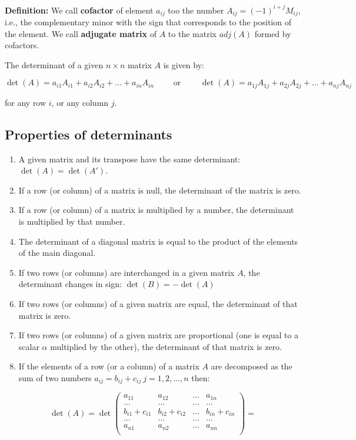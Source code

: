 \documentclass[11pt]{article}
\begin{document}
\textbf{Definition:} We call \textbf{cofactor} of element \(a_{ij}\) too
the number \(A_{ij} = (-1)^{i+j} M_{ij}\), i.e., the complementary minor
with the sign that corresponds to the position of the element. We call
\textbf{adjugate matrix} of \(A\) to the matrix \(adj(A)\) formed by
cofactors.

The determinant of a given \(n\times n\) matrix \(A\) is given by:

\[
\det(A) = a_{i1}A_{i1} + a_{i2}A_{i2} + \ldots + a_{in}A_{in} \qquad \text{ or } \qquad \det(A) = a_{1j}A_{1j} + a_{2j} A_{2j} + \ldots + a_{nj}A_{nj}
\]

for any row \(i\), or any column \(j\).

    \hypertarget{properties-of-determinants}{%
\subsection{Properties of
determinants}\label{properties-of-determinants}}

\begin{enumerate}
\def\labelenumi{\arabic{enumi}.}
\item
  A given matrix and its transpose have the same determinant:
  \(\det(A) = \det(A')\).
\item
  If a row (or column) of a matrix is null, the determinant of the
  matrix is zero.
\item
  If a row (or column) of a matrix is multiplied by a number, the
  determinant is multiplied by that number.
\item
  The determinant of a diagonal matrix is equal to the product of the
  elements of the main diagonal.
\item
  If two rows (or columns) are interchanged in a given matrix \(A\), the
  determinant changes in sign: \(\det(B) = -\det(A)\)
\item
  If two rows (or columns) of a given matrix are equal, the determinant
  of that matrix is zero.
\item
  If two rows (or columns) of a given matrix are proportional (one is
  equal to a scalar \(\alpha\) multiplied by the other), the determinant
  of that matrix is zero.
\item
  If the elements of a row (or a column) of a matrix \(A\) are
  decomposed as the sum of two numbers
  \(a_{ij} = b_{ij} + c_{ij} \: j = 1, 2, \ldots, n\) then:
\end{enumerate}

\[
  \det(A)  = \det \begin{pmatrix} a_{11} & a_{12} & \ldots & a_{1n} \\ \ldots & \ldots & \ldots & \ldots \\ b_{i1}+c_{i1} & b_{i2}+c_{i2} & \ldots & b_{in}+c_{in} \\  \ldots & \ldots & \ldots & \ldots \\ a_{n1} & a_{n2} & \ldots & a_{nn} \\ \end{pmatrix} =
  \]
\end{document}
